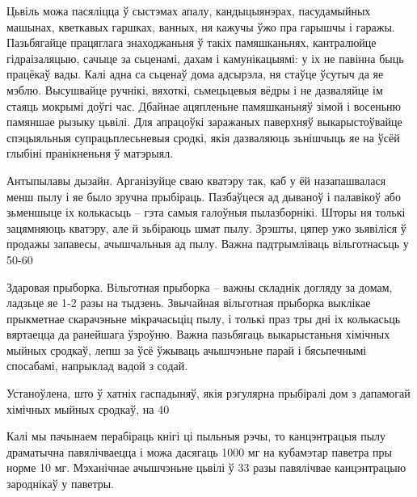 Цьвіль можа пасяліцца ў сыстэмах апалу, кандыцыянэрах, пасудамыйных машынах, кветкавых гаршках, ванных, ня кажучы ўжо пра гарышчы і гаражы. Пазьбягайце працяглага знаходжаньня ў такіх памяшканьнях, кантралюйце гідраізаляцыю, сачыце за сьценамі, дахам і камунікацыямі: у іх не павінна быць працёкаў вады. Калі адна са сьценаў дома адсырэла, ня стаўце ўсутыч да яе мэблю. Высушвайце ручнікі, вяхоткі, сьмецьцевыя вёдры і не дазваляйце ім стаяць мокрымі доўгі час. Дбайнае ацяпленьне памяшканьняў зімой і восеньню памяншае рызыку цьвілі. Для апрацоўкі заражаных паверхняў выкарыстоўвайце спэцыяльныя супрацьплесьневыя сродкі, якія дазваляюць зьнішчыць яе на ўсёй глыбіні пранікненьня ў матэрыял.

Антыпылавы дызайн. Арганізуйце сваю кватэру так, каб у ёй назапашвалася менш пылу і яе было зручна прыбіраць. Пазбаўцеся ад дываноў і палавікоў або зьменшыце іх колькасьць – гэта самыя галоўныя пылазборнікі. Шторы ня толькі зацямняюць кватэру, але й зьбіраюць шмат пылу. Зрэшты, цяпер ужо зьявіліся ў продажы запавесы, ачышчальныя ад пылу. Важна падтрымліваць вільготнасьць у 50-60%

Здаровая прыборка. Вільготная прыборка – важны складнік догляду за домам, ладзьце яе 1-2 разы на тыдзень. Звычайная вільготная прыборка выклікае прыкметнае скарачэньне мікрачасьціц пылу, і толькі праз тры дні іх колькасьць вяртаецца да ранейшага ўзроўню. Важна пазьбягаць выкарыстаньня хімічных мыйных сродкаў, лепш за ўсё ўжываць ачышчэньне парай і бясьпечнымі спосабамі, напрыклад вадой з содай.

Устаноўлена, што ў хатніх гаспадыняў, якія рэгулярна прыбіралі дом з дапамогай хімічных мыйных сродкаў, на 40%

Калі мы пачынаем перабіраць кнігі ці пыльныя рэчы, то канцэнтрацыя пылу драматычна павялічваецца і можа дасягаць 1000 мг на кубамэтар паветра пры норме 10 мг. Мэханічнае ачышчэньне цьвілі ў 33 разы павялічвае канцэнтрацыю зароднікаў у паветры.

